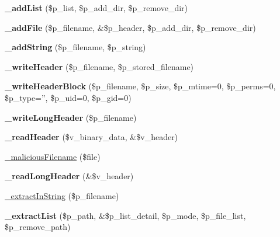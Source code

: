 \begin{DoxyCompactItemize}
\item 
\hypertarget{classArchive__Tar_ae2970c58d14514baa548dea27c4db02c}{
{\bfseries \_\-addList} (\$p\_\-list, \$p\_\-add\_\-dir, \$p\_\-remove\_\-dir)}
\label{classArchive__Tar_ae2970c58d14514baa548dea27c4db02c}

\item 
\hypertarget{classArchive__Tar_a5e597c9506a8716aeef5c6afe982c33e}{
{\bfseries \_\-addFile} (\$p\_\-filename, \&\$p\_\-header, \$p\_\-add\_\-dir, \$p\_\-remove\_\-dir)}
\label{classArchive__Tar_a5e597c9506a8716aeef5c6afe982c33e}

\item 
\hypertarget{classArchive__Tar_a1b8b4c7ca49c6089c6de24c1bdcebf4a}{
{\bfseries \_\-addString} (\$p\_\-filename, \$p\_\-string)}
\label{classArchive__Tar_a1b8b4c7ca49c6089c6de24c1bdcebf4a}

\item 
\hypertarget{classArchive__Tar_a073dd752d0c967ebe2271a0ca5c6e691}{
{\bfseries \_\-writeHeader} (\$p\_\-filename, \$p\_\-stored\_\-filename)}
\label{classArchive__Tar_a073dd752d0c967ebe2271a0ca5c6e691}

\item 
\hypertarget{classArchive__Tar_a0a3bcc5a3631abf6c400a74d09f27a67}{
{\bfseries \_\-writeHeaderBlock} (\$p\_\-filename, \$p\_\-size, \$p\_\-mtime=0, \$p\_\-perms=0, \$p\_\-type='', \$p\_\-uid=0, \$p\_\-gid=0)}
\label{classArchive__Tar_a0a3bcc5a3631abf6c400a74d09f27a67}

\item 
\hypertarget{classArchive__Tar_afe26acd60fa8b3bd827d4281507bbd17}{
{\bfseries \_\-writeLongHeader} (\$p\_\-filename)}
\label{classArchive__Tar_afe26acd60fa8b3bd827d4281507bbd17}

\item 
\hypertarget{classArchive__Tar_adab1ffcb84fe49a937bf149462bd0b4e}{
{\bfseries \_\-readHeader} (\$v\_\-binary\_\-data, \&\$v\_\-header)}
\label{classArchive__Tar_adab1ffcb84fe49a937bf149462bd0b4e}

\item 
\hyperlink{classArchive__Tar_aad06c4df6c3834d7c6f4a468d81bceb3}{\_\-maliciousFilename} (\$file)
\item 
\hypertarget{classArchive__Tar_ae71316c55523e4f4a8eb263aec177f0d}{
{\bfseries \_\-readLongHeader} (\&\$v\_\-header)}
\label{classArchive__Tar_ae71316c55523e4f4a8eb263aec177f0d}

\item 
\hyperlink{classArchive__Tar_a837d36c147a1d6cddcc8ec4f3ed64239}{\_\-extractInString} (\$p\_\-filename)
\item 
\hypertarget{classArchive__Tar_a8e30a94ecd8d0c3a57bf2b06002256cd}{
{\bfseries \_\-extractList} (\$p\_\-path, \&\$p\_\-list\_\-detail, \$p\_\-mode, \$p\_\-file\_\-list, \$p\_\-remove\_\-path)}
\label{classArchive__Tar_a8e30a94ecd8d0c3a57bf2b06002256cd}


\end{DoxyCompactItemize}
